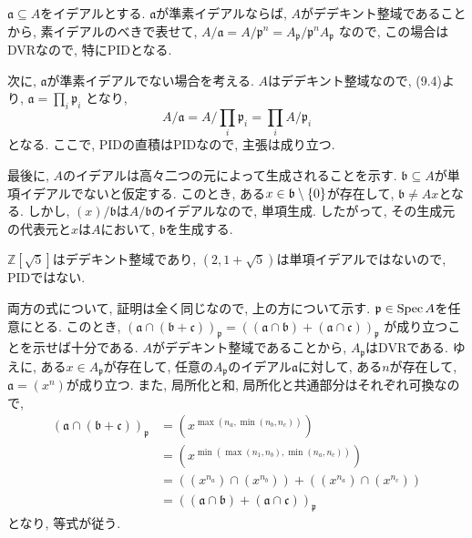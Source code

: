 \documentclass[dvipdfmx]{jsarticle}
\begin{document}
    \begin{problem}
        $\mathfrak{a} \subseteq A$をイデアルとする.
        $\mathfrak{a}$が準素イデアルならば, $A$がデデキント整域であることから,
        素イデアルのべきで表せて,
        $A/\mathfrak{a} = A/\mathfrak{p}^n = A_\mathfrak{p}/\mathfrak{p}^nA_\mathfrak{p}$
        なので,  この場合はDVRなので, 特にPIDとなる.

        次に, $\mathfrak{a}$が準素イデアルでない場合を考える.
        $A$はデデキント整域なので, (9.4)より, $\mathfrak{a} = \prod_{i} \mathfrak{p}_i$
        となり,
        \[
            A/\mathfrak{a} = A/\prod_{i}\mathfrak{p}_i = \prod_i A/\mathfrak{p}_i
        \]
        となる.
        ここで, PIDの直積はPIDなので, 主張は成り立つ.

        最後に, $A$のイデアルは高々二つの元によって生成されることを示す.
        $\mathfrak{b} \subseteq A$が単項イデアルでないと仮定する.
        このとき, ある$x \in \mathfrak{b} \setminus \{0\}$が存在して, $\mathfrak{b} \neq Ax$となる.
        しかし, $(x)/\mathfrak{b}$は$A/\mathfrak{b}$のイデアルなので, 単項生成.
        したがって, その生成元の代表元と$x$は$A$において, $\mathfrak{b}$を生成する.
    \end{problem}

    \begin{note}
        $\mathbb{Z}[\sqrt{5}]$はデデキント整域であり, $(2, 1+\sqrt{5})$は単項イデアルではないので, PIDではない.
    \end{note}


    \begin{problem}
        両方の式について, 証明は全く同じなので, 上の方について示す.
        $\mathfrak{p} \in \operatorname{Spec}{A}$を任意にとる.
        このとき, $(\mathfrak{a}\cap (\mathfrak{b} + \mathfrak{c}))_\mathfrak{p} = ((\mathfrak{a} \cap \mathfrak{b}) + (\mathfrak{a} \cap \mathfrak{c}))_\mathfrak{p}$
        が成り立つことを示せば十分である.
        $A$がデデキント整域であることから, $A_\mathfrak{p}$はDVRである.
        ゆえに, ある$x\in A_\mathfrak{p}$が存在して,
        任意の$A_\mathfrak{p}$のイデアル$\mathfrak{a}$に対して,
        ある$n$が存在して, $\mathfrak{a} = (x^n)$が成り立つ.
        また, 局所化と和, 局所化と共通部分はそれぞれ可換なので,
        \begin{align*}
            (\mathfrak{a} \cap (\mathfrak{b} + \mathfrak{c}))_\mathfrak{p}
            &= (x^{\max(n_a, \min(n_b, n_c))})\\
            &= (x^{\min(\max(n_1, n_b), \min(n_a, n_c))}) \\
            &= ((x^{n_a}) \cap   (x^{n_b})) + ((x^{n_a}) \cap (x^{n_c})) \\
            &= ((\mathfrak{a} \cap \mathfrak{b}) + (\mathfrak{a} \cap \mathfrak{c}))_\mathfrak{p}
        \end{align*}
        となり, 等式が従う.
    \end{problem}
\end{document}

